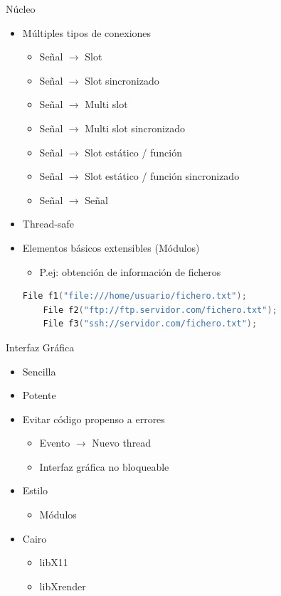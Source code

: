 \documentclass{beamer}
\begin{document}
\begin{frame}[fragile]{Núcleo}
    \begin{itemize}
        \item Múltiples tipos de conexiones
        \begin{itemize}
            \item Señal $\rightarrow$ Slot
            \item Señal $\rightarrow$ Slot sincronizado
            \item Señal $\rightarrow$ Multi slot
            \item Señal $\rightarrow$ Multi slot sincronizado
            \item Señal $\rightarrow$ Slot estático / función
            \item Señal $\rightarrow$ Slot estático / función sincronizado
            \item Señal $\rightarrow$ Señal
        \end{itemize}
        \medskip
        \item Thread-safe
        \medskip
        \item Elementos básicos extensibles (Módulos)
        \begin{itemize}
            \item P.ej: obtención de información de ficheros
        \end{itemize}
\begin{lstlisting}[language=C++]
    File f1("file:///home/usuario/fichero.txt");
    File f2("ftp://ftp.servidor.com/fichero.txt");
    File f3("ssh://servidor.com/fichero.txt");
\end{lstlisting}
    \end{itemize}
\end{frame}

\begin{frame}{Interfaz Gráfica}
    \begin{itemize}
        \item Sencilla
        \medskip
        \item Potente
        \medskip
        \item Evitar código propenso a errores
        \begin{itemize}
            \item Evento $\rightarrow$ Nuevo thread
            \item Interfaz gráfica no bloqueable
        \end{itemize}
        \medskip
        \item Estilo
        \begin{itemize}
            \item Módulos
        \end{itemize}
        \medskip
        \item Cairo
        \begin{itemize}
            \item libX11
            \item libXrender
        \end{itemize}
    \end{itemize}
\end{frame}
\end{document}
